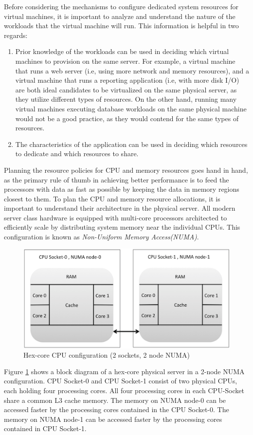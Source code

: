 Before considering the mechanisms to configure dedicated system resources for virtual machines, it is important to analyze and understand the nature of the workloads that the virtual machine will run. This information is helpful in two regards:
\begin{enumerate}
\item Prior knowledge of the workloads can be used in deciding which virtual machines to provision on the same server. For example, a virtual machine that runs a web server (i.e, using  more network and memory resources), and a virtual machine that runs a reporting application (i.e, with more disk I/O) are both ideal candidates to be virtualized on the same physical server, as they utilize different types of resources. On the other hand, running many virtual machines executing database workloads on the same physical machine would not be a good practice, as they would contend for the same types of resources.
\item The characteristics of the application can be used in deciding which resources to dedicate and which resources to share.
\end{enumerate}
Planning the resource policies for CPU and memory resources goes hand in hand, as the primary rule of thumb in achieving better performance is to feed the processors with data as fast as possible by keeping the data in memory regions closest to them. To plan the CPU and memory resource allocations, it is important to understand their architecture in the physical server. All modern server class hardware is equipped with multi-core processors architected to efficiently scale by distributing system memory near the individual CPUs. This configuration is known as \textit{Non-Uniform Memory Access(NUMA)}. 
\begin{figure}[H]
\centering
\includegraphics[width=130mm]{numa.png}
\caption{Hex-core CPU configuration (2 sockets, 2 node NUMA) }
\label{fig:numa}
\end{figure}
Figure \ref{fig:numa} shows a block diagram of a hex-core physical server in a 2-node NUMA configuration. CPU Socket-0 and CPU Socket-1 consist of two physical CPUs, each holding four processing cores. All four processing cores in each CPU-Socket share a common L3 cache memory. The memory on NUMA node-0 can be accessed faster by the processing cores contained in the CPU Socket-0. The memory on NUMA node-1 can be accessed faster by the processing cores contained in CPU Socket-1.



